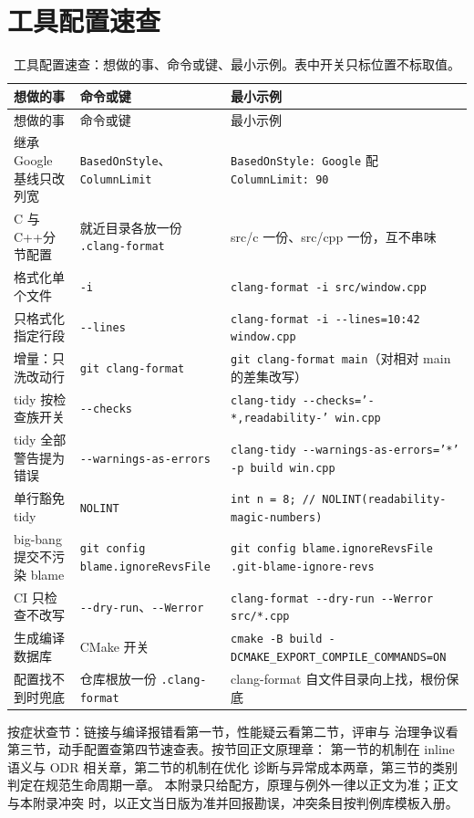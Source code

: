\documentclass[12pt,a4paper,fontset=fandol]{ctexbook}
\newcommand{\Tp}[1]{\texttt{#1}}
\newcommand{\Opt}[1]{\texttt{-\/-#1}}
\newcommand{\Bk}{\discretionary{}{}{}}
\newcommand{\Lang}[1]{\textsf{#1}}
\newcommand{\CPP}{\Lang{C++}}
\begin{document}
\section{工具配置速查}

\begin{longtable}{>{\raggedright\arraybackslash}p{}
  >{\raggedright\arraybackslash}p{}
  >{\raggedright\arraybackslash}p{}}
\caption{工具配置速查：想做的事、命令或键、最小示例。表中开关只标位置不标取值。}\label{tab:apc-tooling}\\
\toprule
想做的事 & 命令或键 & 最小示例\\
\midrule
\endfirsthead
\toprule
想做的事 & 命令或键 & 最小示例\\
\midrule
\endhead
继承 Google 基线只改列宽
& \Tp{BasedOnStyle}、\Tp{ColumnLimit}
& \Tp{BasedOnStyle: Google} 配 \Tp{ColumnLimit: 90}\\
\addlinespace
C 与 \CPP 分节配置
& 就近目录各放一份 \Tp{.clang-format}
& src/c 一份、src/cpp 一份，互不串味\\
\addlinespace
格式化单个文件
& \Tp{-i}
& \Tp{clang-format -i src/window.cpp}\\
\addlinespace
只格式化指定行段
& \Opt{lines}
& \Tp{clang-format -i \Opt{lines=10:42} window.cpp}\\
\addlinespace
增量：只洗改动行
& \Tp{git clang-format}
& \Tp{git clang-format main}\Bk（对相对 main 的差集改写）\\
\addlinespace
tidy 按检查族开关
& \Opt{checks}
& \Tp{clang-tidy \Opt{checks='-*,\allowbreak{}readability-\allowbreak *'} win.cpp}\\
\addlinespace
tidy 全部警告提为错误
& \Opt{warnings-as-\allowbreak errors}
& \Tp{clang-tidy \Opt{warnings-as-errors='*'} -p build win.cpp}\\
\addlinespace
单行豁免 tidy
& \Tp{NOLINT}
& \Tp{int n = 8; // NOLINT(readability-\allowbreak{}magic-\allowbreak{}numbers)}\\
\addlinespace
big-bang 提交不污染 blame
& \Tp{git config blame{\Bk}.ignore{\Bk}Revs{\Bk}File}
& \Tp{git config blame{\Bk}.ignore{\Bk}Revs{\Bk}File .git-blame-ignore-\allowbreak{}revs}\\
\addlinespace
CI 只检查不改写
& \Opt{dry-run}、\Opt{Werror}
& \Tp{clang-format \Opt{dry-run} \Opt{Werror} src/*.cpp}\\
\addlinespace
生成编译数据库
& CMake 开关
& \Tp{cmake -B build -DCMAKE{\Bk}\_EXPORT{\Bk}\_COMPILE{\Bk}\_COMMANDS=ON}\\
\addlinespace
配置找不到时兜底
& 仓库根放一份 \Tp{.clang-format}
& clang-format 自文件目录向上找，根份保底\\
\bottomrule
\end{longtable}

\begin{guideline}[title={本附录的使用法}]
按症状查节：链接与编译报错看第一节，性能疑云看第二节，评审与
治理争议看第三节，动手配置查第四节速查表。按节回正文原理章：
第一节的机制在 inline 语义与 ODR 相关章，第二节的机制在优化
诊断与异常成本两章，第三节的类别判定在规范生命周期一章。
本附录只给配方，原理与例外一律以正文为准；正文与本附录冲突
时，以正文当日版为准并回报勘误，冲突条目按判例库模板入册。
\end{guideline}
\end{document}
